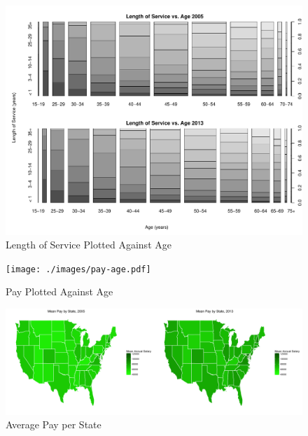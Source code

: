 \documentclass{article}
\begin{document}
\begin{center}
    \begin{figure}
        \includegraphics[scale=0.4]{./images/los-age.pdf}
        \caption{Length of Service Plotted Against Age}
        \label{losage}
    \end{figure}
\end{center}

\begin{center}
    \begin{figure}
        \texttt{[image: ./images/pay-age.pdf]}
        \caption{Pay Plotted Against Age}
        \label{payage}
    \end{figure}
\end{center}

\begin{center}
    \begin{figure}
        \includegraphics[scale=0.3]{./images/pay-state.png}
        \caption{Average Pay per State}
        \label{paystate}
    \end{figure}
\end{center}
\end{document}
